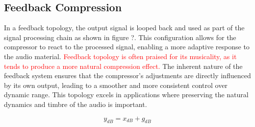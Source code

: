 \documentclass[10pt]{article}
\begin{document}
\begin{multicols*}{2}
            \subsection{Feedback Compression}  
                In a feedback topology, the output signal is looped back and used as part of the signal processing chain as shown in figure ?. This configuration allows for the compressor to react to the processed signal, enabling a more adaptive response to the audio material. \textcolor{red}{Feedback topology is often praised for its musicality, as it tends to produce a more natural compression effect.} The inherent nature of the feedback system ensures that the compressor's adjustments are directly influenced by its own output, leading to a smoother and more consistent control over dynamic range. This topology excels in applications where preserving the natural dynamics and timbre of the audio is important.
                
                    \begin{equation} \label{eq:feedback}
                        y_{dB}=x_{dB}+g_{dB}
                    \end{equation}

                    \noindent
                    \begin{minipage}{\linewidth}

                        \centering

\end{minipage}
\end{multicols*}
\end{document}
